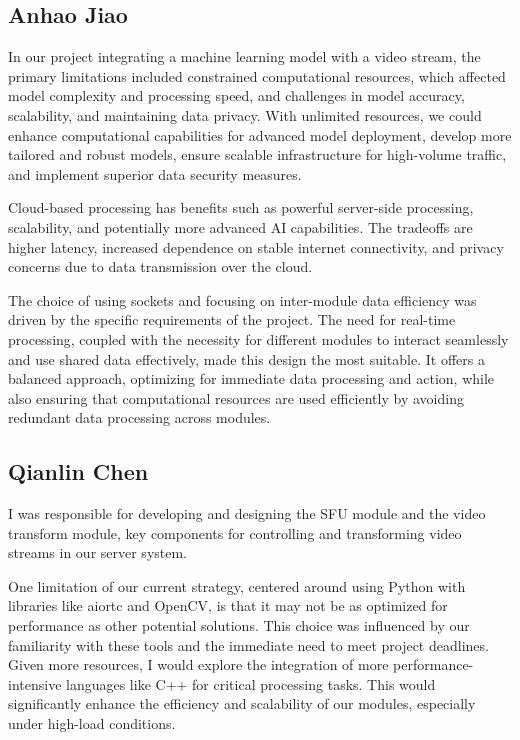 \documentclass[12pt, titlepage]{article}
\begin{document}
\subsection{Anhao Jiao}
In our project integrating a machine learning model with a video stream, the primary limitations included constrained computational resources, which affected model complexity and processing speed, and challenges in model accuracy, scalability, and maintaining data privacy. With unlimited resources, we could enhance computational capabilities for advanced model deployment, develop more tailored and robust models, ensure scalable infrastructure for high-volume traffic, and implement superior data security measures.

Cloud-based processing has benefits such as powerful server-side processing, scalability, and potentially more advanced AI capabilities. The tradeoffs are higher latency, increased dependence on stable internet connectivity, and privacy concerns due to data transmission over the cloud.

The choice of using sockets and focusing on inter-module data efficiency was driven by the specific requirements of the project. The need for real-time processing, coupled with the necessity for different modules to interact seamlessly and use shared data effectively, made this design the most suitable. It offers a balanced approach, optimizing for immediate data processing and action, while also ensuring that computational resources are used efficiently by avoiding redundant data processing across modules.

\subsection{Qianlin Chen}
I was responsible for developing and designing the SFU module and the video transform module, key components for controlling and transforming video streams in our server system.

One limitation of our current strategy, centered around using Python with libraries like aiortc and OpenCV, is that it may not be as optimized for performance as other potential solutions. This choice was influenced by our familiarity with these tools and the immediate need to meet project deadlines. Given more resources, I would explore the integration of more performance-intensive languages like C++ for critical processing tasks. This would significantly enhance the efficiency and scalability of our modules, especially under high-load conditions.
\end{document}
